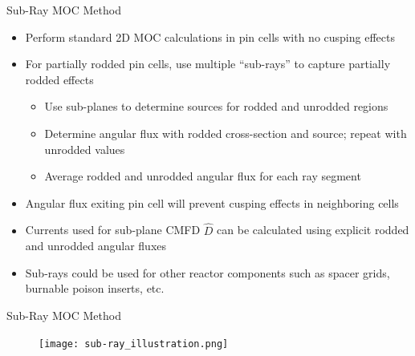 
\begin{frame}[t]{Sub-Ray MOC Method}
    
    \begin{itemize}
        \item Perform standard 2D MOC calculations in pin cells with no cusping effects
        \item For partially rodded pin cells, use multiple ``sub-rays'' to capture partially rodded effects
        \begin{itemize}
            \item Use sub-planes to determine sources for rodded and unrodded regions
            \item Determine angular flux with rodded cross-section and source; repeat with unrodded values
            \item Average rodded and unrodded angular flux for each ray segment
        \end{itemize}
        \item Angular flux exiting pin cell will prevent cusping effects in neighboring cells
        \item Currents used for sub-plane CMFD $\hat{D}$ can be calculated using explicit rodded and unrodded angular fluxes
        \item Sub-rays could be used for other reactor components such as spacer grids, burnable poison inserts, etc.
    \end{itemize}
    
\end{frame}


\begin{frame}[t]{Sub-Ray MOC Method}

\begin{figure}
    \centering
    \texttt{[image: sub-ray\_illustration.png]}
\end{figure}

\end{frame}